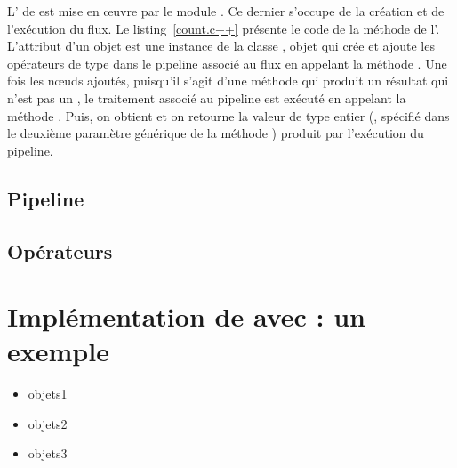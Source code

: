L' de  est mise en œuvre par le module . Ce dernier s'occupe de la cr\'eation et de l'ex\'ecution du flux. Le listing~\ref{count.c++} pr\'esente le code de la m\'ethode  de l'. L'attribut  d'un objet  est une instance de la classe , objet qui cr\'ee et ajoute les op\'erateurs de type  dans le pipeline associé au flux en appelant la m\'ethode . Une fois les n\oe{}uds ajoutés, puisqu'il s'agit d'une méthode qui produit un résultat qui n'est pas un , le traitement associé au pipeline  est ex\'ecut\'e en appelant la m\'ethode . Puis, on obtient et on retourne la valeur de type entier (, sp\'ecifi\'e dans le deuxi\`eme param\`etre générique de la m\'ethode ) produit par l'exécution du pipeline.

\subsection{Pipeline}
\subsection{Opérateurs}


\section{Impl\'ementation de  avec  : un exemple}


\begin{itemize}

\item objets1 

\item objets2 

\item objets3 


\end{itemize}

